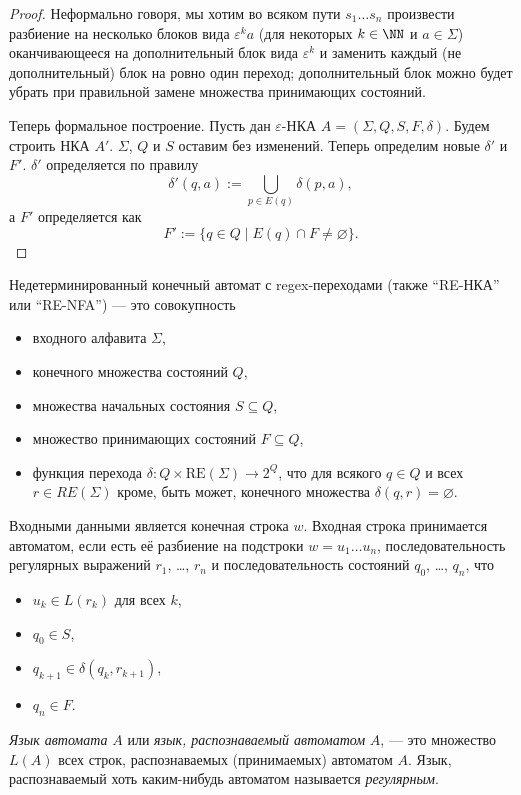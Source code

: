 \documentclass[12pt,a4paper]{article}
\newcommand{\RE}{\mathrm{RE}}
\begin{document}
    \begin{proof}
        Неформально говоря, мы хотим во всяком пути $s_1 \dots s_n$ произвести разбиение на несколько блоков вида $\varepsilon^k a$ (для некоторых $k \in \NN$ и $a \in \Sigma$) оканчивающееся на дополнительный блок вида $\varepsilon^k$ и заменить каждый (не дополнительный) блок на ровно один переход; дополнительный блок можно будет убрать при правильной замене множества принимающих состояний.

        Теперь формальное построение. Пусть дан $\varepsilon$-НКА $A = (\Sigma, Q, S, F, \delta)$. Будем строить НКА $A'$. $\Sigma$, $Q$ и $S$ оставим без изменений. Теперь определим новые $\delta'$ и $F'$. $\delta'$ определяется по правилу
        \[\delta'(q, a) := \bigcup_{p \in E(q)} \delta(p, a),\]
        а $F'$ определяется как
        \[F' := \{q \in Q \mid E(q) \cap F \neq \varnothing\}.\]
    \end{proof}

    \begin{definition}
        Недетерминированный конечный автомат с regex-переходами (также ``RE-НКА'' или ``RE-NFA'') --- это совокупность
        \begin{itemize}
            \item входного алфавита $\Sigma$,
            \item конечного множества состояний $Q$,
            \item множества начальных состояния $S \subseteq Q$,
            \item множество принимающих состояний $F \subseteq Q$,
            \item функция перехода $\delta: Q \times \RE(\Sigma) \to 2^Q$, что для всякого $q \in Q$ и всех $r \in RE(\Sigma)$ кроме, быть может, конечного множества $\delta(q, r) = \varnothing$.
        \end{itemize}
        Входными данными является конечная строка $w$. Входная строка принимается автоматом, если есть её разбиение на подстроки $w = u_1 \dots u_n$, последовательность регулярных выражений $r_1$, \dots, $r_n$ и последовательность состояний $q_0$, \dots, $q_n$, что
        \begin{itemize}
            \item $u_k \in L(r_k)$ для всех $k$,
            \item $q_0 \in S$,
            \item $q_{k+1} \in \delta(q_k, r_{k+1})$,
            \item $q_n \in F$.
        \end{itemize}

        \emph{Язык автомата} $A$ или \emph{язык, распознаваемый автоматом} $A$, --- это множество $L(A)$ всех строк, распознаваемых (принимаемых) автоматом $A$. Язык, распознаваемый хоть каким-нибудь автоматом называется \emph{регулярным}.
    \end{definition}
\end{document}
